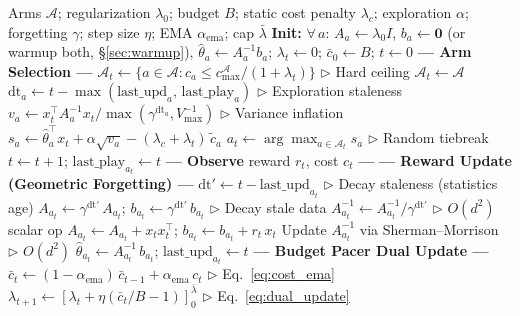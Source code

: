 \begin{algorithm}[t]
\caption{ParetoBandit: Budget-Paced Non-Stationary Routing}
\label{alg:paretobandit}
\begin{algorithmic}[1]
\REQUIRE Arms $\mathcal{A}$; regularization $\lambda_0$; budget $B$; static cost penalty $\lambda_c$; exploration $\alpha$; forgetting $\gamma$; step size $\eta$; EMA $\alpha_{\mathrm{ema}}$; cap $\bar\lambda$
\STATE \textbf{Init:} $\forall\, a$: $A_a \!\leftarrow\! \lambda_0 I$, $b_a \!\leftarrow\! \mathbf{0}$ (or warmup both, \S\ref{sec:warmup}), $\hat\theta_a \!\leftarrow\! A_a^{-1} b_a$; $\lambda_t \!\leftarrow\! 0$; $\bar{c}_0 \!\leftarrow\! B$; $t \!\leftarrow\! 0$
\STATE \textbf{--- Arm Selection ---}
\STATE $\mathcal{A}_t \leftarrow \{a \in \mathcal{A} : c_a \leq c_{\max}^{\mathcal{A}} / (1 {+} \lambda_t)\}$ \label{line:ceiling} \hfill $\triangleright$ Hard ceiling
\ELSE
\STATE $\mathcal{A}_t \leftarrow \mathcal{A}$
\ENDIF
{}
\STATE $\mathrm{dt}_a \leftarrow t - \max(\text{last\_upd}_a,\, \text{last\_play}_a)$ \hfill $\triangleright$ Exploration staleness
\STATE $v_a \leftarrow x_t^\top A_a^{-1} x_t / \max(\gamma^{\mathrm{dt}_a}, V_{\max}^{-1})$ \hfill $\triangleright$ Variance inflation
\STATE $s_a \leftarrow \hat\theta_a^\top x_t + \alpha\sqrt{v_a} - (\lambda_c + \lambda_t)\,\tilde{c}_a$ \label{line:ucb}
\ENDFOR
\STATE $a_t \leftarrow \arg\max_{a \in \mathcal{A}_t} s_a$ \hfill $\triangleright$ Random tiebreak
\STATE $t \leftarrow t + 1$;\; $\text{last\_play}_{a_t} \leftarrow t$
\STATE \textbf{--- Observe} reward $r_t$, cost $c_t$ \textbf{---}
\STATE \textbf{--- Reward Update (Geometric Forgetting) ---}
\STATE $\mathrm{dt}' \leftarrow t - \text{last\_upd}_{a_t}$ \hfill $\triangleright$ Decay staleness (statistics age)
\STATE $A_{a_t} \leftarrow \gamma^{\mathrm{dt}'}\, A_{a_t}$;\; $b_{a_t} \leftarrow \gamma^{\mathrm{dt}'}\, b_{a_t}$ \label{line:forget} \hfill $\triangleright$ Decay stale data
\STATE $A_{a_t}^{-1} \leftarrow A_{a_t}^{-1} / \gamma^{\mathrm{dt}'}$ \hfill $\triangleright$ $O(d^2)$ scalar op
\STATE $A_{a_t} \leftarrow A_{a_t} + x_t x_t^\top$;\; $b_{a_t} \leftarrow b_{a_t} + r_t\, x_t$
\STATE Update $A_{a_t}^{-1}$ via Sherman--Morrison \hfill $\triangleright$ $O(d^2)$
\STATE $\hat\theta_{a_t} \leftarrow A_{a_t}^{-1}\, b_{a_t}$;\; $\text{last\_upd}_{a_t} \leftarrow t$
\STATE \textbf{--- Budget Pacer Dual Update ---}
\STATE $\bar{c}_t \leftarrow (1 {-} \alpha_{\mathrm{ema}})\,\bar{c}_{t-1} + \alpha_{\mathrm{ema}}\,c_t$ \hfill $\triangleright$ Eq.~\ref{eq:cost_ema}
\STATE $\lambda_{t+1} \leftarrow [\lambda_t + \eta(\bar{c}_t / B - 1)]_{0}^{\bar\lambda}$ \label{line:dual} \hfill $\triangleright$ Eq.~\ref{eq:dual_update}
\ENDFOR
\end{algorithmic}
\end{algorithm}

